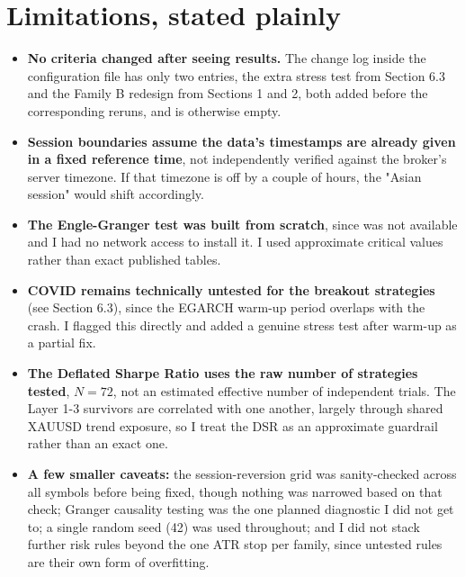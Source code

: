 \documentclass[11pt]{article}
\newcommand{\code}[1]{\texttt{\detokenize{#1}}}
\begin{document}
\section{Limitations, stated plainly}
\begin{itemize}[leftmargin=13pt,itemsep=0.3pt,topsep=1pt]
\item \textbf{No criteria changed after seeing results.} The change log inside the configuration file has only two
entries, the extra stress test from Section 6.3 and the Family B redesign from Sections 1 and 2, both added before
the corresponding reruns, and is otherwise empty.
\item \textbf{Session boundaries assume the data's timestamps are already given in a fixed reference time}, not
independently verified against the broker's server timezone. If that timezone is off by a couple of hours, the
"Asian session" would shift accordingly.
\item \textbf{The Engle-Granger test was built from scratch}, since \code{statsmodels} was not available and I had
no network access to install it. I used approximate critical values rather than exact published tables.
\item \textbf{COVID remains technically untested for the breakout strategies} (see Section 6.3), since the EGARCH
warm-up period overlaps with the crash. I flagged this directly and added a genuine stress test after warm-up as a
partial fix.
\item \textbf{The Deflated Sharpe Ratio uses the raw number of strategies tested}, $N=72$, not an estimated
effective number of independent trials. The Layer 1-3 survivors are correlated with one another, largely through
shared XAUUSD trend exposure, so I treat the DSR as an approximate guardrail rather than an exact one.
\item \textbf{A few smaller caveats:} the session-reversion grid was sanity-checked across all symbols before being
fixed, though nothing was narrowed based on that check; Granger causality testing was the one planned diagnostic I
did not get to; a single random seed (42) was used throughout; and I did not stack further risk rules beyond the
one ATR stop per family, since untested rules are their own form of overfitting.
\end{itemize}
\end{document}
